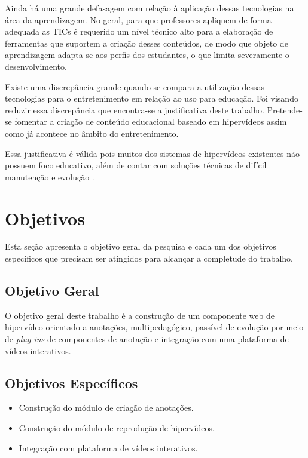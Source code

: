 Ainda há uma grande defasagem com relação à aplicação dessas tecnologias na área da aprendizagem. No geral, para que professores apliquem de forma adequada as TICs é requerido um nível técnico alto para a elaboração de ferramentas que suportem a criação desses conteúdos, de modo que objeto de aprendizagem adapta-se aos perfis dos estudantes, o que limita severamente o desenvolvimento.

Existe uma discrepância grande quando se compara a utilização dessas tecnologias para o entretenimento em relação ao uso para educação. Foi visando reduzir essa discrepância que encontra-se a justificativa deste trabalho. Pretende-se fomentar a criação de conteúdo educacional baseado em hipervídeos assim como já acontece no âmbito do entretenimento.

Essa justificativa é válida pois muitos dos sistemas de hipervídeos existentes não possuem foco educativo, além de contar com soluções técnicas de difícil manutenção e evolução \cite{sadallah2012}.

\section{Objetivos}

Esta seção apresenta o objetivo geral da pesquisa e cada um dos objetivos específicos que precisam ser atingidos para alcançar a completude do trabalho.

\subsection{Objetivo Geral}

O objetivo geral deste trabalho é a construção de um componente web de hipervídeo orientado a anotações, multipedagógico, passível de evolução por meio de \textit{plug-ins} de componentes de anotação e integração com uma plataforma de vídeos interativos.

\subsection{Objetivos Específicos}

\begin{itemize}
	\item Construção do módulo de criação de anotações.
	\item Construção do módulo de reprodução de hipervídeos.
	\item Integração com plataforma de vídeos interativos.
\end{itemize}

